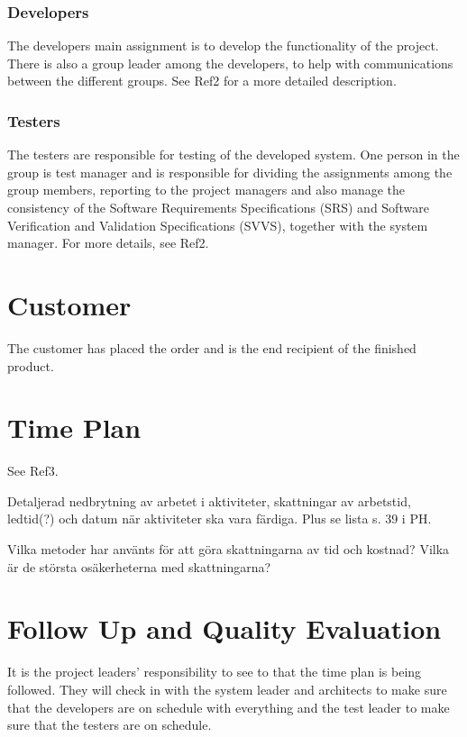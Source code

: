 \documentclass[a4paper]{article}
\begin{document}
\subsubsection{Developers}
The developers main assignment is to develop the functionality of the project. There is also a group leader among the developers, to help with communications between the different groups. See Ref2 for a more detailed description.

\subsubsection{Testers}
The testers are responsible for testing of the developed system. One person in the group is test manager and is responsible for dividing the assignments among the group members, reporting to the project managers and also manage the consistency of the Software Requirements Specifications (SRS) and Software Verification and Validation Specifications (SVVS), together with the system manager. For more details, see Ref2.

\section{Customer}
The customer has placed the order and is the end recipient of the finished product.

\section{Time Plan}
See Ref3.

Detaljerad nedbrytning av arbetet i aktiviteter, skattningar av arbetstid, ledtid(?) och datum när aktiviteter ska vara färdiga. Plus se lista s. 39 i PH.

Vilka metoder har använts för att göra skattningarna av tid och kostnad? Vilka är de största osäkerheterna med skattningarna?


\section{Follow Up and Quality Evaluation}

It is the project leaders' responsibility to see to that the time plan is being followed. They will check in with the system leader and architects to make sure that the developers are on schedule with everything and the test leader to make sure that the testers are on schedule.
\end{document}
